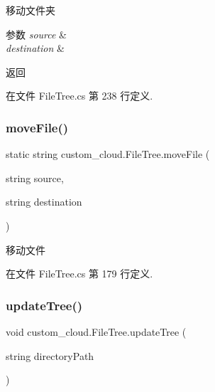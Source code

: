 移动文件夹 


\begin{DoxyParams}{参数}
{\em source} & \\
\hline
{\em destination} & \\
\hline
\end{DoxyParams}
\begin{DoxyReturn}{返回}

\end{DoxyReturn}


在文件 File\+Tree.\+cs 第 238 行定义.

\mbox{\label{classcustom__cloud_1_1_file_tree_ac36e502bbb41d66b40d0ee2d6f291e33}} 
\subsubsection{\texorpdfstring{move\+File()}{moveFile()}}
{\footnotesize\ttfamily static string custom\+\_\+cloud.\+File\+Tree.\+move\+File (\begin{DoxyParamCaption}\item[{string}]{source,  }\item[{string}]{destination }\end{DoxyParamCaption})\hspace{0.3cm}{\ttfamily [static]}}



移动文件 



在文件 File\+Tree.\+cs 第 179 行定义.

\mbox{\label{classcustom__cloud_1_1_file_tree_a15e1a46477dd1f518c167fae8d9e4e3a}} 
\subsubsection{\texorpdfstring{update\+Tree()}{updateTree()}}
{\footnotesize\ttfamily void custom\+\_\+cloud.\+File\+Tree.\+update\+Tree (\begin{DoxyParamCaption}\item[{string}]{directory\+Path }\end{DoxyParamCaption})}



